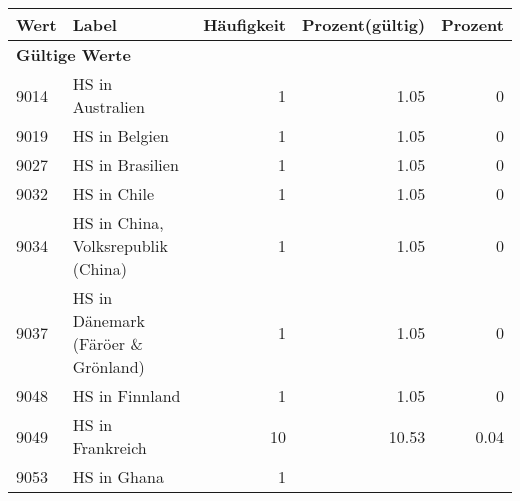      \begin{longtable}{lXrrr}
     \toprule
     \textbf{Wert} & \textbf{Label} & \textbf{Häufigkeit} & \textbf{Prozent(gültig)} & \textbf{Prozent} \\
     \endhead
     \midrule
     \multicolumn{5}{l}{\textbf{Gültige Werte}}\\
        9014 & \multicolumn{1}{X}{HS in Australien} & %
          \num{1} &
          \num[round-mode=places,round-precision=2]{1.05} &
          \num[round-mode=places,round-precision=2]{0} \\
        9019 & \multicolumn{1}{X}{HS in Belgien} & %
          \num{1} &
          \num[round-mode=places,round-precision=2]{1.05} &
          \num[round-mode=places,round-precision=2]{0} \\
        9027 & \multicolumn{1}{X}{HS in Brasilien} & %
          \num{1} &
          \num[round-mode=places,round-precision=2]{1.05} &
          \num[round-mode=places,round-precision=2]{0} \\
        9032 & \multicolumn{1}{X}{HS in Chile} & %
          \num{1} &
          \num[round-mode=places,round-precision=2]{1.05} &
          \num[round-mode=places,round-precision=2]{0} \\
        9034 & \multicolumn{1}{X}{HS in China, Volksrepublik (China)} & %
          \num{1} &
          \num[round-mode=places,round-precision=2]{1.05} &
          \num[round-mode=places,round-precision=2]{0} \\
        9037 & \multicolumn{1}{X}{HS in Dänemark (Färöer \& Grönland)} & %
          \num{1} &
          \num[round-mode=places,round-precision=2]{1.05} &
          \num[round-mode=places,round-precision=2]{0} \\
        9048 & \multicolumn{1}{X}{HS in Finnland} & %
          \num{1} &
          \num[round-mode=places,round-precision=2]{1.05} &
          \num[round-mode=places,round-precision=2]{0} \\
        9049 & \multicolumn{1}{X}{HS in Frankreich} & %
          \num{10} &
          \num[round-mode=places,round-precision=2]{10.53} &
          \num[round-mode=places,round-precision=2]{0.04} \\
        9053 & \multicolumn{1}{X}{HS in Ghana} & %
          \num{1} &

\end{longtable}
